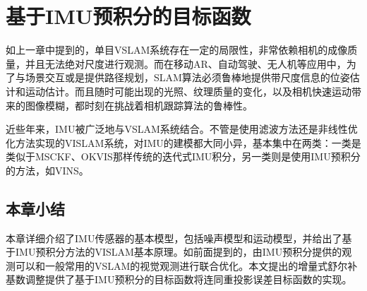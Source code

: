 \chapter{基于IMU预积分的目标函数}\label{ch:vislam}

如上一章中提到的，单目VSLAM系统存在一定的局限性，非常依赖相机的成像质量，并且无法绝对尺度进行观测\citep{jones2011visual}。而在移动AR、自动驾驶、无人机等应用中，为了与场景交互或是提供路径规划，SLAM算法必须鲁棒地提供带尺度信息的位姿估计和运动估计。而且随时可能出现的光照、纹理质量的变化，以及相机快速运动带来的图像模糊，都时刻在挑战着相机跟踪算法的鲁棒性。

近些年来，IMU被广泛地与VSLAM系统结合。不管是使用滤波方法还是非线性优化方法实现的VISLAM系统，对IMU的建模都大同小异，基本集中在两类：一类是类似于MSCKF\citep{mourikis2007multi}、OKVIS\citep{leutenegger2015keyframe}那样传统的迭代式IMU积分，另一类则是使用IMU预积分\citep{forster2017manifold}的方法，如VINS\citep{li2017monocular}。



\section{本章小结}

本章详细介绍了IMU传感器的基本模型，包括噪声模型和运动模型，并给出了基于IMU预积分方法的VISLAM基本原理。如前面提到的，由IMU预积分提供的观测可以和一般常用的VSLAM的视觉观测进行联合优化。本文提出的增量式舒尔补基数调整提供了基于IMU预积分的目标函数将连同重投影误差目标函数的实现。
